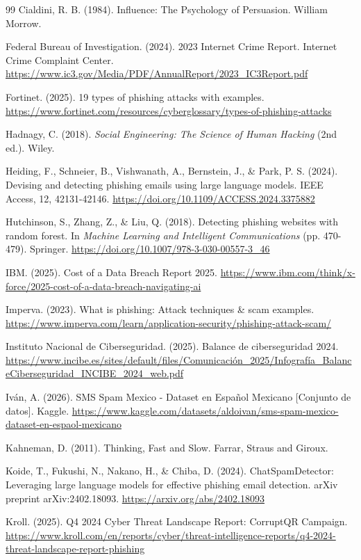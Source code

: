 \documentclass[11pt,a4paper,oneside]{report}
\begin{document}
\begin{thebibliography}{99}
 Cialdini, R. B. (1984). Influence: The Psychology of Persuasion. William Morrow.

 Federal Bureau of Investigation. (2024). 2023 Internet Crime Report. Internet Crime Complaint Center. \url{https://www.ic3.gov/Media/PDF/AnnualReport/2023_IC3Report.pdf}

 Fortinet. (2025). 19 types of phishing attacks with examples. \url{https://www.fortinet.com/resources/cyberglossary/types-of-phishing-attacks}

 Hadnagy, C. (2018). \emph{Social Engineering: The Science of Human Hacking} (2nd ed.). Wiley.

 Heiding, F., Schneier, B., Vishwanath, A., Bernstein, J., \& Park, P. S. (2024). Devising and detecting phishing emails using large language models. IEEE Access, 12, 42131-42146. \url{https://doi.org/10.1109/ACCESS.2024.3375882}

 Hutchinson, S., Zhang, Z., \& Liu, Q. (2018). Detecting phishing websites with random forest. In \emph{Machine Learning and Intelligent Communications} (pp. 470-479). Springer. \url{https://doi.org/10.1007/978-3-030-00557-3_46}

 IBM. (2025). Cost of a Data Breach Report 2025. \url{https://www.ibm.com/think/x-force/2025-cost-of-a-data-breach-navigating-ai}

 Imperva. (2023). What is phishing: Attack techniques \& scam examples. \url{https://www.imperva.com/learn/application-security/phishing-attack-scam/}

 Instituto Nacional de Ciberseguridad. (2025). Balance de ciberseguridad 2024. \url{https://www.incibe.es/sites/default/files/Comunicación_2025/Infografía_BalanceCiberseguridad_INCIBE_2024_web.pdf}

 Iván, A. (2026). SMS Spam Mexico - Dataset en Español Mexicano [Conjunto de datos]. Kaggle. \url{https://www.kaggle.com/datasets/aldoivan/sms-spam-mexico-dataset-en-espaol-mexicano}

 Kahneman, D. (2011). Thinking, Fast and Slow. Farrar, Straus and Giroux.

 Koide, T., Fukushi, N., Nakano, H., \& Chiba, D. (2024). ChatSpamDetector: Leveraging large language models for effective phishing email detection. arXiv preprint arXiv:2402.18093. \url{https://arxiv.org/abs/2402.18093}

 Kroll. (2025). Q4 2024 Cyber Threat Landscape Report: CorruptQR Campaign. \url{https://www.kroll.com/en/reports/cyber/threat-intelligence-reports/q4-2024-threat-landscape-report-phishing}


\end{thebibliography}
\end{document}
